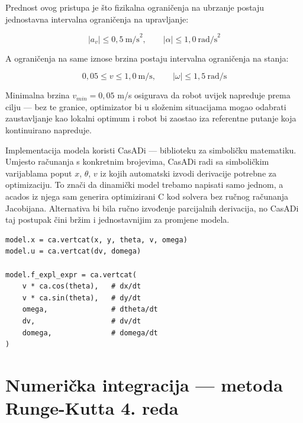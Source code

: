 Prednost ovog pristupa je što fizikalna ograničenja na ubrzanje postaju jednostavna intervalna ograničenja na upravljanje:

\begin{equation}
  |a_v| \leq 0{,}5 \ \text{m/s}^2, \qquad |\alpha| \leq 1{,}0 \ \text{rad/s}^2
\end{equation}

A ograničenja na same iznose brzina postaju intervalna ograničenja na stanja:

\begin{equation}
  0{,}05 \leq v \leq 1{,}0 \ \text{m/s}, \qquad |\omega| \leq 1{,}5 \ \text{rad/s}
\end{equation}

Minimalna brzina $v_{min} = 0{,}05$ m/s osigurava da robot uvijek napreduje prema cilju --- bez te granice, optimizator bi u složenim situacijama mogao odabrati zaustavljanje kao lokalni optimum i robot bi zaostao iza referentne putanje koja kontinuirano napreduje.

Implementacija modela koristi CasADi \cite{andersson2019casadi, casadi_web} --- biblioteku za simboličku matematiku. Umjesto računanja s konkretnim brojevima, CasADi radi sa simboličkim varijablama poput $x$, $\theta$, $v$ iz kojih automatski izvodi derivacije potrebne za optimizaciju. To znači da dinamički model trebamo napisati samo jednom, a acados iz njega sam generira optimizirani C kod solvera bez ručnog računanja Jacobijana. Alternativa bi bila ručno izvođenje parcijalnih derivacija, no CasADi taj postupak čini bržim i jednostavnijim za promjene modela.

\begin{listing}[H]
\begin{verbatim}
model.x = ca.vertcat(x, y, theta, v, omega)
model.u = ca.vertcat(dv, domega)

model.f_expl_expr = ca.vertcat(
    v * ca.cos(theta),   # dx/dt
    v * ca.sin(theta),   # dy/dt
    omega,               # dtheta/dt
    dv,                  # dv/dt
    domega,              # domega/dt
)
\end{verbatim}
\caption{Implementacija proširenog modela monocikla u \texttt{src/model.py}}
\end{listing}

\section{Numerička integracija — metoda Runge-Kutta 4. reda}

